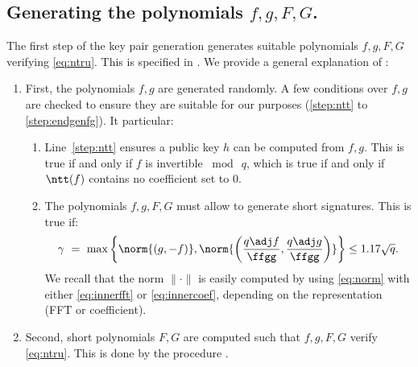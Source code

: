  \begin{algorithm}[!htp]
  \caption{$\keygen(\phi, q)$}\label{alg:keygen}
 \begin{algorithmic}[1]
  \label{alg:keygen:ntru}
  \label{alg:keygen:bgnhatb}
  \State{$\hat \matB \gets \fft(\matB)$} 
  \State{$\matG \gets \hat\matB \times \adj{\hat\matB}$}\label{alg:keygen:endhatb}
  \State{$\tree \gets \ffldl(\matG)$}\label{alg:keygen:bgnftree}
  \label{normal:start}
  \label{normal:end}
  \EndFor
  \State{$\sk \gets (\hat\matB, \tree)$}
  \label{alg:keygen:pk}
  \Return{$\sk, \pk$}
  \end{algorithmic}
 \end{algorithm}


\subsection{Generating the polynomials \texorpdfstring{$f,g,F,G$}{f, g, F, G}.}\label{sec:spec:keygen:ntrugen}

The first step of the key pair generation generates suitable polynomials $f,g,F,G$ verifying \eqref{eq:ntru}. This is specified in \longntrugen. We provide a general explanation of \ntrugen:
\begin{enumerate}
 \item First, the polynomials $f,g$ are generated randomly. A few conditions over $f,g$ are checked to ensure they are suitable for our purposes (\cref{step:ntt} to \cref{step:endgenfg}). It particular:
 \begin{enumerate}
  \item Line~\ref{step:ntt} ensures a public key $h$ can be computed from $f,g$. This is true if and only if $f$ is invertible $\bmod\ q$, which is true if and only if $\ntt(f)$ contains no coefficient set to $0$.
  \item The polynomials $f,g,F,G$ must allow to generate short signatures. This is true if:
  \begin{equation}
  \gamma~=~\max \left\{ \norm{(g,-f)},  \norm{\left(\frac{q\adj f}{\ffgg},\frac{q\adj g}{\ffgg}\right)} \right\} \leq 1.17\sqrt{q}.
  \end{equation}
  We recall that the norm $\|\cdot\|$ is easily computed by using \eqref{eq:norm} with either \eqref{eq:innerfft} or \eqref{eq:innercoef}, depending on the representation (FFT or coefficient).
 \end{enumerate}
 \item Second, short polynomials $F,G$ are computed such that $f,g,F,G$ verify \eqref{eq:ntru}. This is done by the procedure \longntrusolve.
 \end{enumerate}

